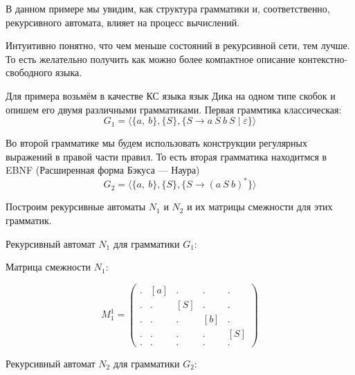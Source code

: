 \begin{example}

В данном примере мы увидим, как структура грамматики и, соответственно, рекурсивного автомата, влияет на процесс вычислений.

Интуитивно понятно, что чем меньше состояний в рекурсивной сети, тем лучше.
То есть желательно получить как можно более компактное описание контекстно-свободного языка.

Для примера возьмём в качестве КС языка язык Дика на одном типе скобок и опишем его двумя различными грамматиками.
Первая граммтика классическая:
$$
G_1 = \langle \{a,\ b\}, \{ S \}, \{S \to a \ S \ b \ S \mid \varepsilon  \} \rangle
$$

Во второй грамматике мы будем использовать конструкции регулярных выражений в правой части правил.
То есть вторая грамматика находитмся в EBNF (Расширенная форма Бэкуса — Наура) %
$$
G_2 = \langle \{a, \ b\}, \{S\}, \{S \to (a \ S \ b)^{*}\} \rangle
$$

Построим рекурсивные автоматы $N_1$ и $N_2$ и их матрицы смежности для этих грамматик.

Рекурсивный автомат $N_1$ для грамматики $G_1$:
\begin{center}
\end{center}

Матрица смежности $N_1$:

$$
M_1^1 =
\begin{pmatrix}
. & [a] & .   & .   & .  \\
. & .   & [S] & .   & .  \\
. & .   & .   & [b] & .  \\
. & .   & .   & .   & [S] \\
. & .   & .   & .   & .
\end{pmatrix}
$$


Рекурсивный автомат $N_2$ для грамматики $G_2$:
\begin{center}
\end{center}


\end{example}
